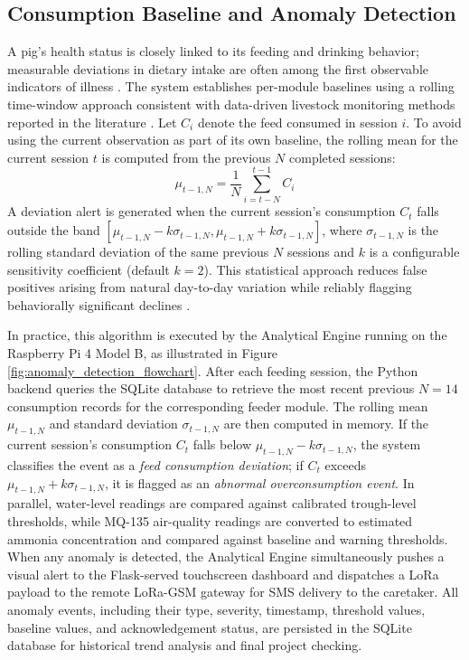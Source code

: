 \subsection{Consumption Baseline and Anomaly Detection}
A pig's health status is closely linked to its feeding and drinking behavior; measurable deviations in dietary intake are often among the first observable indicators of illness \cite{dingcong2017monitoring,sadeghi2023improving}. The system establishes per-module baselines using a rolling time-window approach consistent with data-driven livestock monitoring methods reported in the literature \cite{racewicz2021welfare,sadeghi2023improving}. Let $C_i$ denote the feed consumed in session $i$. To avoid using the current observation as part of its own baseline, the rolling mean for the current session $t$ is computed from the previous $N$ completed sessions:
\begin{equation}
  \mu_{t-1,N} = \frac{1}{N} \sum_{i=t-N}^{t-1} C_i
\end{equation}
A deviation alert is generated when the current session's consumption $C_t$ falls outside the band $[\mu_{t-1,N} - k\sigma_{t-1,N}, \mu_{t-1,N} + k\sigma_{t-1,N}]$, where $\sigma_{t-1,N}$ is the rolling standard deviation of the same previous $N$ sessions and $k$ is a configurable sensitivity coefficient (default $k=2$). This statistical approach reduces false positives arising from natural day-to-day variation while reliably flagging behaviorally significant declines \cite{sadeghi2023improving,racewicz2021welfare}.

In practice, this algorithm is executed by the Analytical Engine running on the Raspberry Pi 4 Model B, as illustrated in Figure \ref{fig:anomaly_detection_flowchart}. After each feeding session, the Python backend queries the SQLite database to retrieve the most recent previous $N = 14$ consumption records for the corresponding feeder module. The rolling mean $\mu_{t-1,N}$ and standard deviation $\sigma_{t-1,N}$ are then computed in memory. If the current session's consumption $C_t$ falls below $\mu_{t-1,N} - k\sigma_{t-1,N}$, the system classifies the event as a \textit{feed consumption deviation}; if $C_t$ exceeds $\mu_{t-1,N} + k\sigma_{t-1,N}$, it is flagged as an \textit{abnormal overconsumption event}. In parallel, water-level readings are compared against calibrated trough-level thresholds, while MQ-135 air-quality readings are converted to estimated ammonia concentration and compared against baseline and warning thresholds. When any anomaly is detected, the Analytical Engine simultaneously pushes a visual alert to the Flask-served touchscreen dashboard and dispatches a LoRa payload to the remote LoRa-GSM gateway for SMS delivery to the caretaker. All anomaly events, including their type, severity, timestamp, threshold values, baseline values, and acknowledgement status, are persisted in the SQLite database for historical trend analysis and final project checking.

